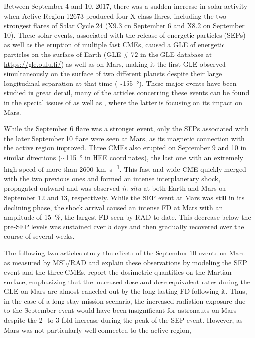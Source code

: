 Between September 4 and 10, 2017, there was a sudden increase in solar activity when Active Region 12673 produced four X-class flares, including the two strongest flares of Solar Cycle 24 (X9.3 on September 6 and X8.2 on September 10). These solar events, associated with the release of energetic particles (\acp{SEP}) as well as the eruption of multiple fast \acp{CME}, caused a \ac{GLE} of energetic particles on the surface of Earth (\ac{GLE} \# 72 in the \ac{GLE} database at \url{https://gle.oulu.fi/}) as well as on Mars, making it the first \ac{GLE} observed simultaneously on the surface of two different planets despite their large longitudinal separation at that time ($\sim$\SI{155}{\degree}). These major events have been studied in great detail, many of the articles concerning these events can be found in the special issues of \citet{SpaceWeather-2018-special-issue-September-event} as well as \citet{GRL-2018-special-issue-September-event}, where the latter is focusing on its impact on Mars.

While the September 6 flare was a stronger event, only the \acp{SEP} associated with the later September 10 flare were seen at Mars, as its magnetic connection with the active region improved. Three CMEs also erupted on September 9 and 10 in similar directions ($\sim$\SI{115}{\degree} in \ac{HEE} coordinates), the last one with an extremely high speed of more than \SI{2600}{\kilo\meter\per\second}. This fast and wide CME quickly merged with the two previous ones and formed an intense interplanetary shock, propagated outward and was observed \textit{in situ} at both Earth and Mars on September 12 and 13, respectively. While the \ac{SEP} event at Mars was still in its declining phase, the shock arrival caused an intense \ac{FD} at Mars with an amplitude of \SI{15}{\percent}, the largest \ac{FD} seen by RAD to date. This decrease below the pre-\ac{SEP} levels was sustained over 5 days and then gradually recovered over the course of several weeks.

The following two articles \citep{Zeitlin-2018,Guo-2018} study the effects of the September 10 events on Mars as measured by \ac{MSL}/\ac{RAD} and explain these observations by modeling the \ac{SEP} event and the three \acp{CME}. \citet{Zeitlin-2018} report the dosimetric quantities on the Martian surface, emphasizing that the increased dose and dose equivalent rates during the \ac{GLE} on Mars are almost canceled out by the long-lasting \ac{FD} following it. Thus, in the case of a long-stay mission scenario, the increased radiation exposure due to the September event would have been insignificant for astronauts on Mars despite the 2- to 3-fold increase during the peak of the \ac{SEP} event. However, as Mars was not particularly well connected to the active region, 



